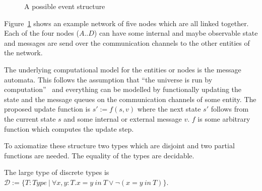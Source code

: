 \begin{figure}[ht]
  \centering
  \caption{A possible event structure}
  \label{fig:structure}
\end{figure}

Figure~\ref{fig:structure} shows an example network of five nodes which
are all linked together. Each of the four nodes ($A..D$) can have some internal
and maybe observable state and messages are send over the communication channels
to the other entities of the network. 

The underlying computational model for the entities or nodes is the
message automata. This follows the assumption that ``the universe is run by
computation''~\cite{bickford2005causal} and everything can be modelled
by functionally updating the state and the message queues on the communication
channels of some entity. The proposed update function is $s':=f(s,v)$ where
the next state $s'$ follows from the current state $s$ and some internal or
external message $v$. $f$ is some arbitrary function which computes
the update step.~\cite{bickford2005causal}

To axiomatize these structure two types which are disjoint and two partial
functions are needed. The equality of the types are decidable.

\begin{defi}
  The large type of discrete types is
  $\mathcal{D}:=\{T:Type\ |\ \forall x,y:T.x=y\ in\ T\vee\neg (x=y\ in\ T)\}$.
  \textnormal{~\cite{bickford2005causal}}
\end{defi}

